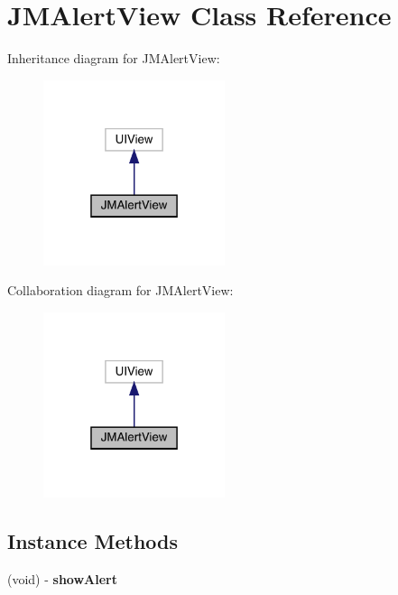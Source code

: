 \hypertarget{interface_j_m_alert_view}{}\section{J\+M\+Alert\+View Class Reference}
\label{interface_j_m_alert_view}


Inheritance diagram for J\+M\+Alert\+View\+:\nopagebreak
\begin{figure}[H]
\begin{center}
\leavevmode
\includegraphics[width=151pt]{interface_j_m_alert_view__inherit__graph}
\end{center}
\end{figure}


Collaboration diagram for J\+M\+Alert\+View\+:\nopagebreak
\begin{figure}[H]
\begin{center}
\leavevmode
\includegraphics[width=151pt]{interface_j_m_alert_view__coll__graph}
\end{center}
\end{figure}
\subsection*{Instance Methods}
\begin{DoxyCompactItemize}
\item 
\mbox{\label{interface_j_m_alert_view_a803c5b239c26a65f5432660fcf83e380}} 
(void) -\/ {\bfseries show\+Alert}
\end{DoxyCompactItemize}
